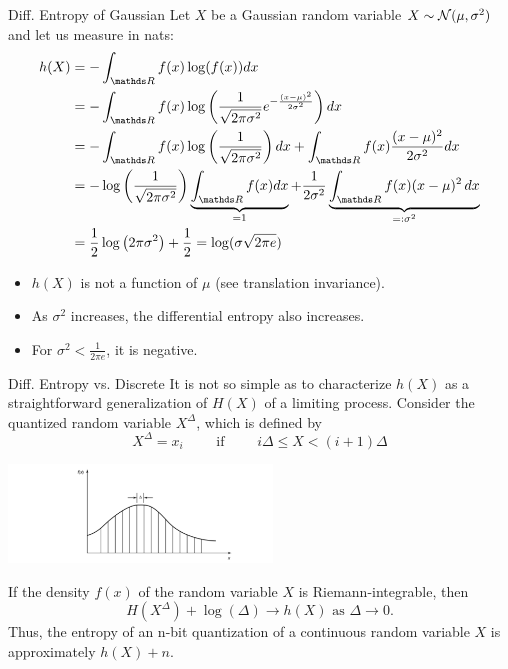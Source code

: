 \documentclass[11pt,compress,t,notes=noshow, xcolor=table]{beamer}
\begin{document}
\begin{vbframe}{Diff. Entropy of Gaussian}
Let $X$ be a Gaussian random variable $X \sim \mathcal{N}(\mu, \sigma^2)$ and let us measure in nats:
  \begin{equation*}
    \begin{aligned} 
     h(X) &= - \int_{\R} f(x) \log(f(x)) dx \\
          &=  - \int_{\R} f(x) \log\left(\frac{1}{\sqrt{2 \pi \sigma^{2}}} e^{-\frac{(x-\mu)^{2}}{2 \sigma^{2}}} \right) dx \\
          &= - \int_{\R} f(x) \log\left(\frac{1}{\sqrt{2 \pi \sigma^{2}}}\right) dx + \int_{\R} f(x) \frac{(x-\mu)^{2}}{2 \sigma^{2}} dx \\
          &= - \log \left(\frac{1}{\sqrt{2 \pi \sigma^{2}}}\right) \underbrace{\int_{\R} f(x) dx}_{= 1} + \frac{1}{2\sigma^2} \underbrace{\int_{\R} f(x) (x-\mu)^{2}\,dx}_{=: \sigma^2} \\
          &= \frac{1}{2} \log \left(2 \pi \sigma^{2}\right) + \frac{1}{2} =  \log(\sigma \sqrt{2\pi e})
    \end{aligned}
  \end{equation*}
\framebreak

  \begin{itemize}
    \item $h(X)$ is not a function of $\mu$ (see translation invariance).
    \item As $\sigma^2$ increases, the differential entropy also increases.
    \item For $\sigma^2 < \frac{1}{2\pi e}$, it is negative.
    
  \end{itemize}
\end{vbframe}


\begin{vbframe}{Diff. Entropy vs. Discrete}
It is not so simple as to characterize $h(X)$ as 
a straightforward generalization of $H(X)$ of a limiting process.
Consider the quantized random variable $X^\Delta$, which is defined by
$$X^\Delta = x_i \qquad \text{ if } \qquad i \Delta \leq X < (i + 1) \Delta$$  
\begin{center}
\includegraphics[width = 7cm ]{figure_man/diffent-quant.png} \\
\end{center}

If the density $f(x)$ of the random variable $X$ is Riemann-integrable, then
$$H(X^\Delta) + \log(\Delta) \rightarrow h(X) \text{ as } \Delta \rightarrow 0.$$
Thus, the entropy of an n-bit quantization of a continuous random variable 
$X$ is approximately $h(X) + n$.
\end{vbframe}
\end{document}
